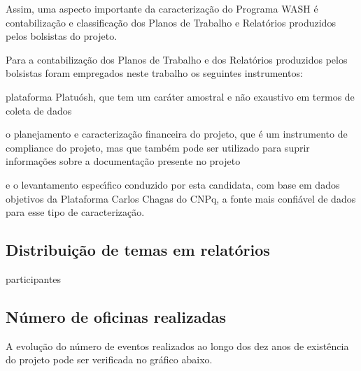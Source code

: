 \documentclass[
12pt,		%
openright,	%
twoside,  %
a4paper,			%
chapter=TITLE,		%
english,			%
french,				%
spanish,			%
brazil				%
]{USPSC-classe/USPSC}
\begin{document}
Assim, uma aspecto importante da caracteriza\c{c}\~ao do Programa WASH \'e contabiliza\c{c}\~ao e classifica\c{c}\~ao dos Planos de Trabalho e Relat\'orios produzidos pelos bolsistas do projeto.




Para a contabiliza\c{c}\~ao dos Planos de Trabalho e dos Relat\'orios produzidos pelos bolsistas foram empregados neste trabalho os seguintes instrumentos:





\begin{alineas}
\item plataforma Platu\'osh, que tem um car\'ater amostral e n\~ao exaustivo em termos de coleta de dados
\item o planejamento e caracteriza\c{c}\~ao financeira do projeto, que \'e um instrumento de compliance do projeto, mas que tamb\'em pode ser utilizado para suprir informa\c{c}\~oes sobre a documenta\c{c}\~ao presente no projeto
\item e o levantamento espec\'{\i}fico conduzido por esta candidata, com base em dados objetivos da Plataforma Carlos Chagas do CNPq, a fonte mais confi\'avel de dados para esse tipo de caracteriza\c{c}\~ao.
\end{alineas}

\subsection[Distribui\c{c}\~ao de temas em relat\'orios]{Distribui\c{c}\~ao de temas em relat\'orios}\label{Distribui\c{c}\~ao de temas em relat\'orios}
participantes




\subsection[N\'umero de oficinas realizadas]{N\'umero de oficinas realizadas}\label{N\'umero de oficinas realizadas}
A evolu\c{c}\~ao do n\'umero de eventos realizados ao longo dos dez anos de exist\^encia do projeto pode ser verificada no gr\'afico abaixo.
\end{document}
